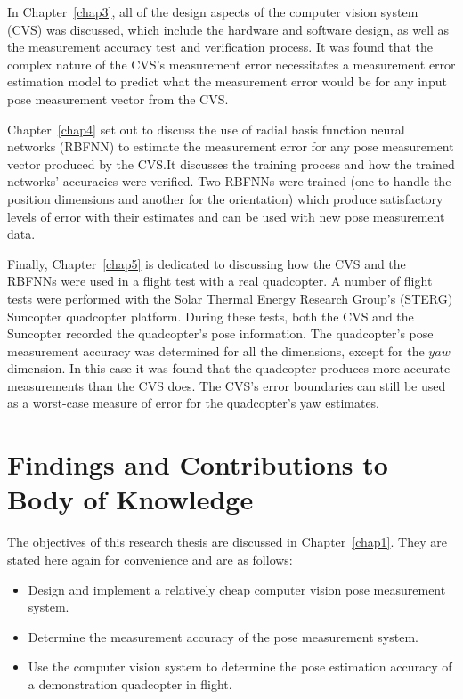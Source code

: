 In Chapter~\ref{chap3}, all of the design aspects of the computer vision system (CVS) was discussed, which include the hardware and software design, as well as the measurement accuracy test and verification process. It was found that the complex nature of the CVS's measurement error necessitates a measurement error estimation model to predict what the measurement error would be for any input pose measurement vector from the CVS.\@ 

Chapter~\ref{chap4} set out to discuss the use of radial basis function neural networks (RBFNN) to estimate the measurement error for any pose measurement vector produced by the CVS.\@ It discusses the training process and how the trained networks' accuracies were verified. Two RBFNNs were trained (one to handle the position dimensions and another for the orientation) which produce satisfactory levels of error with their estimates and can be used with new pose measurement data.

Finally, Chapter~\ref{chap5} is dedicated to discussing how the CVS and the RBFNNs were used in a flight test with a real quadcopter. A number of flight tests were performed with the Solar Thermal Energy Research Group's (STERG) Suncopter quadcopter platform. During these tests, both the CVS and the Suncopter recorded the quadcopter's pose information. The quadcopter's pose measurement accuracy was determined for all the dimensions, except for the $yaw$ dimension. In this case it was found that the quadcopter produces more accurate measurements than the CVS does. The CVS's error boundaries can still be used as a worst-case measure of error for the quadcopter's yaw estimates. 


\section{Findings and Contributions to Body of Knowledge}

The objectives of this research thesis are discussed in Chapter~\ref{chap1}. They are stated here again for convenience and are as follows:

\begin{itemize}
  \item Design and implement a relatively cheap computer vision pose measurement system.
  \item Determine the measurement accuracy of the pose measurement system.
  \item Use the computer vision system to determine the pose estimation accuracy of a demonstration quadcopter in flight. 
\end{itemize}

